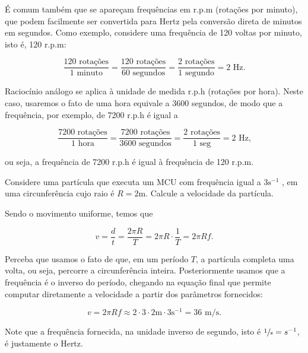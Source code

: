 É comum também que se apareçam frequências em r.p.m (rotações por minuto), que podem facilmente ser convertida para Hertz pela conversão direta de minutos em segundos. Como exemplo, considere uma frequência de 120 voltas por minuto, isto é, 120 r.p.m:

$$  \dfrac{120\text{ rotações}}{1 \text{ minuto}} = \dfrac{120\text{ rotações}}{60 \text{ segundos}} = \dfrac{2\text{ rotações}}{1 \text{ segundo}} = 2 \text{ Hz.}$$

Raciocínio análogo se aplica à unidade de medida r.p.h (rotações por hora). Neste caso, usaremos o fato de uma hora equivale a $3600$ segundos, de modo que a frequência, por exemplo, de 7200 r.p.h é igual a

$$ \dfrac{7200\text{ rotações}}{1 \text{ hora}} =  \dfrac{7200\text{ rotações}}{3600 \text{ segundos}} = \dfrac{2 \text{ rotações}}{1 \text{ seg}} = 2 \text{ Hz,} $$

\noindent ou seja, a frequência de 7200 r.p.h é igual à frequência de 120 r.p.m.

\vspace{0.3cm}


\begin{exemplo}[Nível I]\label{exemplo_cinvet_periodofrequenciaex01}

Considere uma partícula que executa um MCU com frequência igual a $3 \text{s}^{-1}$ , em uma circunferência cujo raio é $R=2$m. Calcule a velocidade da partícula.

\resolucao

Sendo o movimento uniforme, temos que

$$ v=\dfrac{d}{t}=\dfrac{2 \pi R}{T} = 2 \pi R \cdot \dfrac{1}{T} = 2 \pi R f.$$

\noindent Perceba que usamos o fato de que, em um período $T$, a partícula completa uma volta, ou seja, percorre a circunferência inteira. Posteriormente usamos que a frequência é o inverso do período, chegando na equação final que permite computar diretamente a velocidade a partir dos parâmetros fornecidos:

$$ v = 2 \pi R f \approx 2 \cdot 3 \cdot 2 \text{m} \cdot 3 \text{s}^{-1} = 36 \text{ m/s}.$$

\noindent Note que a frequência fornecida, na unidade inverso de segundo, isto é $\sfrac{1}{s}=s^{-1}$, é justamente o Hertz.

\end{exemplo}





